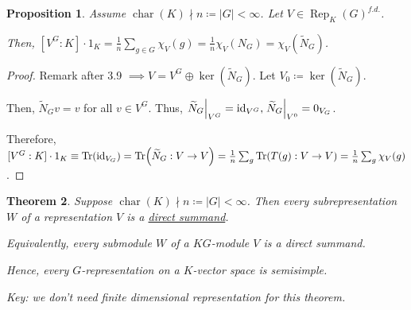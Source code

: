 \documentclass{article}
\theoremstyle{definition}
\theoremstyle{plain}
\newtheorem{theorem}{Theorem}[section]
\newtheorem{proposition}[theorem]{Proposition}
\theoremstyle{remark}
\begin{document}
    \begin{proposition}
        Assume \(\operatorname{char}(K) \nmid n \coloneqq \vert G \vert < \infty\). Let \(V \in \operatorname{Rep}_K(G)^{f.d.}\).

        Then, \([V^G:K] \cdot 1_K = \frac{1}{n} \sum_{g\in G} \chi_V(g) = \frac{1}{n} \chi_V(N_G) = \chi_V(\widetilde{N}_G)\). 
    \end{proposition}

    \begin{proof}
        Remark after 3.9 \(\implies V = V^G \oplus \ker(\widetilde{N}_G)\). Let \(V_0 \coloneqq \ker(\widetilde{N}_G)\).

        Then, \(\widetilde{N}_G v = v\) for all \(v\in V^G\). Thus, \(\eval{\widetilde{N}_G}_{V^G} = \operatorname{id}_{V^G}, \eval{\widetilde{N}_G}_{V^0}=0_{V_G}\).
        
        Therefore, \([V^G:K]\cdot 1_K \equiv  \Tr(\operatorname{id}_{V_G}) = \Tr(\widetilde{N}_G : V \to V) = \frac{1}{n} \sum_{g} \Tr(T(g): V \to V) = \frac{1}{n} \sum_{g} \chi_V(g)\). 
    \end{proof}

    \begin{theorem}
        Suppose \(\operatorname{char}(K) \nmid n \coloneqq \vert G \vert < \infty\). Then every subrepresentation \(W\) of a representation \(V\) is a \underline{direct summand}.

        Equivalently, every submodule \(W\) of a \(KG\)-module \(V\) is a direct summand.

        Hence, every \(G\)-representation on a \(K\)-vector space is semisimple.

        Key: we don't need finite dimensional representation for this theorem.
    \end{theorem}
\end{document}
